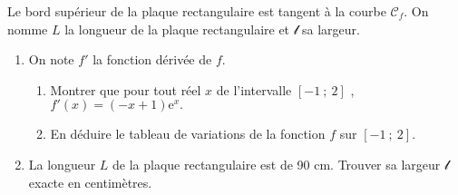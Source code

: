 Le bord supérieur de la plaque rectangulaire est tangent à la courbe $ \mathscr{C}_{ f }$. On nomme $L$ la longueur de la plaque rectangulaire et $ \mathscr{l}$ sa largeur.
\begin{enumerate}
     \item
     On note $f' $ la fonction dérivée de  $f$.
     \begin{enumerate}[label=\alph*.]
          \item
          Montrer que pour tout réel $x$ de l'intervalle $[  - 1~;~2 ]$ , $f' ( x )=(  - x+1 )\text{e}^{ x }. $
          \item
          En déduire le tableau de variations de la fonction $f$ sur $[  - 1~;~2 ].$
     \end{enumerate}
     \item
     La longueur $L$ de la plaque rectangulaire est de 90 cm. Trouver sa largeur $ \mathscr{l}$ exacte en centimètres.
\end{enumerate}
